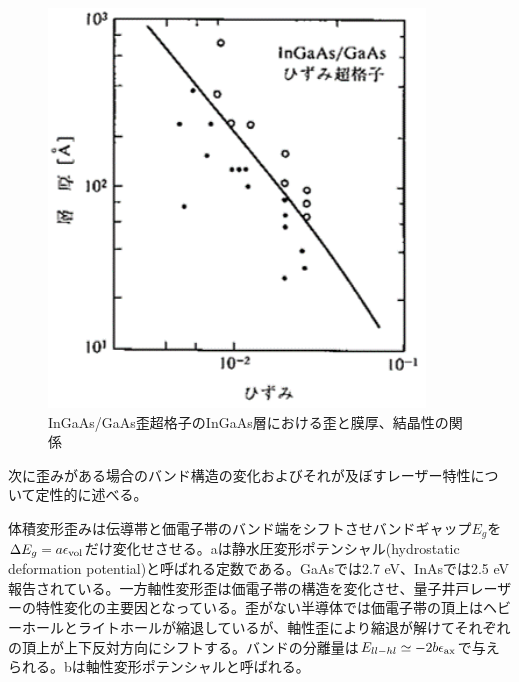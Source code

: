 \begin{figure}[h]
	\centering
	\includegraphics[width=10cm]{figure/fig_1_2_strain_vs_d.png}
	\caption{InGaAs/GaAs歪超格子のInGaAs層における歪と膜厚、結晶性の関係}
	\label{fig:fig_1_2_strain_vs_d}
\end{figure}

次に歪みがある場合のバンド構造の変化およびそれが及ぼすレーザー特性について定性的に述べる。

体積変形歪みは伝導帯と価電子帯のバンド端をシフトさせバンドギャップ$E_{g}$を$\Delta E_{g}=a\epsilon_{\rm{vol}}$だけ変化せさせる。aは静水圧変形ポテンシャル(hydrostatic deformation potential)と呼ばれる定数である。GaAsでは2.7 eV、InAsでは2.5 eV報告されている\cite{ref_adachi}。一方軸性変形歪は価電子帯の構造を変化させ、量子井戸レーザーの特性変化の主要因となっている。歪がない半導体では価電子帯の頂上はヘビーホールとライトホールが縮退しているが、軸性歪により縮退が解けてそれぞれの頂上が上下反対方向にシフトする。バンドの分離量は$E_{ll-hl}\simeq -2b\epsilon_{\rm{ax}}$で与えられる。bは軸性変形ポテンシャルと呼ばれる。


